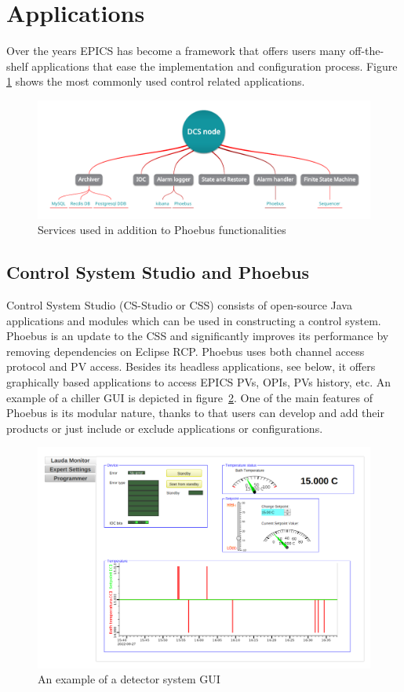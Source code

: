 \section{Applications}
Over the years EPICS has become a framework that offers users many off-the-shelf applications that ease the implementation and configuration process. Figure \ref{fig_dcs_node_msts} shows the most commonly used control related applications. 

\begin{figure}[!h]
\centering
\includegraphics[width=0.9\columnwidth]{Chapter3/DCS/images/dcs_node.png}
\caption{Services used in addition to Phoebus functionalities}
\label{fig_dcs_node_msts}
\end{figure}
\subsection{Control System Studio and Phoebus}
Control System Studio (CS-Studio or CSS) consists of open-source Java applications and modules which can be used in constructing a control system. Phoebus is an update to the \gls{CSS} and significantly improves its performance by removing dependencies on Eclipse RCP. Phoebus uses both channel access protocol and PV access. Besides its headless applications, see below, it offers graphically based applications to access EPICS PVs, OPIs, PVs history, etc. An example of a chiller GUI is depicted in figure~\ref{fig_lauda1}. One of the main features of Phoebus is its modular nature, thanks to that users can develop and add their products or just include or exclude applications or configurations. 


\begin{figure}[!h]
\centering
\includegraphics[width=0.75\columnwidth]{Chapter3/DCS/images/lauda1.png}
\caption{An example of a detector system \gls{GUI}}
\label{fig_lauda1}
\end{figure}

